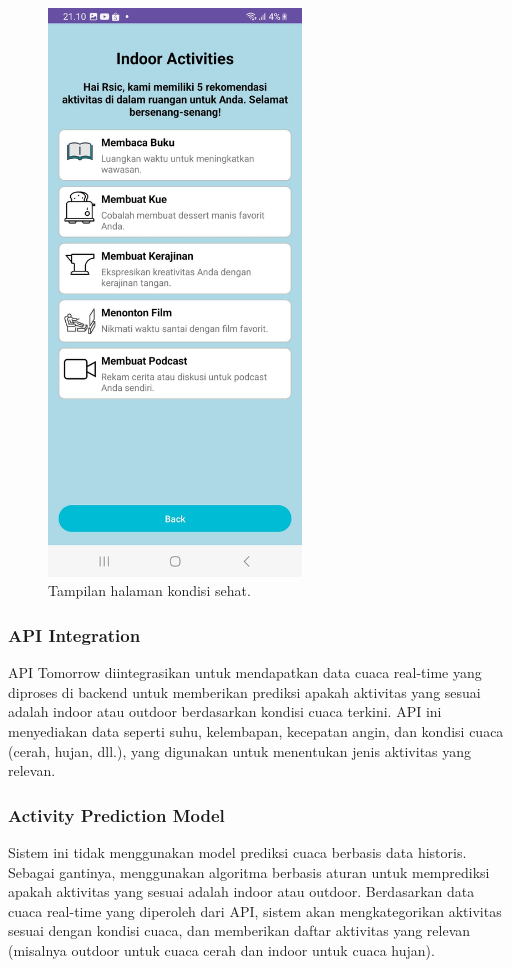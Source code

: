 \documentclass[journal,article,submit,pdftex,moreauthors]{Definitions/mdpi}
\begin{document}
\begin{figure}[H]
    \centering
    \includegraphics[width=0.6\textwidth]{Definitions/images/07.jpeg}
    \caption{Tampilan halaman kondisi sehat.}
    \label{fig:help-page}
\end{figure}


\subsubsection{API Integration}
API Tomorrow diintegrasikan untuk mendapatkan data cuaca real-time yang diproses di backend untuk memberikan prediksi apakah aktivitas yang sesuai adalah indoor atau outdoor berdasarkan kondisi cuaca terkini. API ini menyediakan data seperti suhu, kelembapan, kecepatan angin, dan kondisi cuaca (cerah, hujan, dll.), yang digunakan untuk menentukan jenis aktivitas yang relevan.

\subsubsection{Activity Prediction Model}
Sistem ini tidak menggunakan model prediksi cuaca berbasis data historis. Sebagai gantinya, menggunakan algoritma berbasis aturan untuk memprediksi apakah aktivitas yang sesuai adalah indoor atau outdoor. Berdasarkan data cuaca real-time yang diperoleh dari API, sistem akan mengkategorikan aktivitas sesuai dengan kondisi cuaca, dan memberikan daftar aktivitas yang relevan (misalnya outdoor untuk cuaca cerah dan indoor untuk cuaca hujan).
\end{document}
